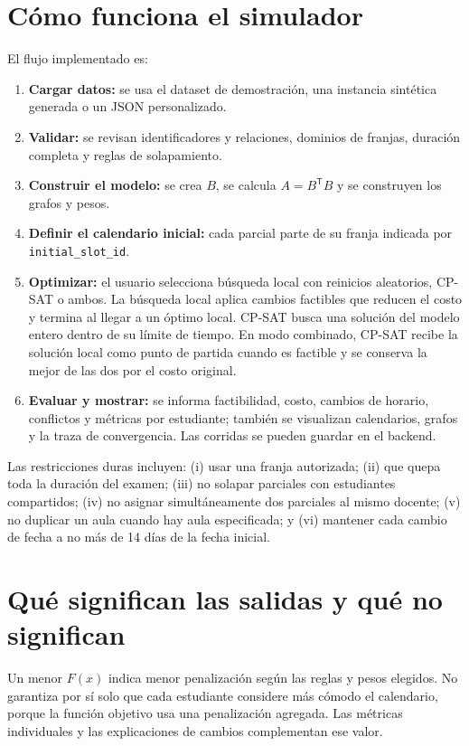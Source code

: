 \documentclass[11pt,a4paper]{article}
\begin{document}
\section{Cómo funciona el simulador}
El flujo implementado es:
\begin{enumerate}[leftmargin=*]
    \item \textbf{Cargar datos:} se usa el dataset de demostración, una instancia sintética generada o un JSON personalizado.
    \item \textbf{Validar:} se revisan identificadores y relaciones, dominios de franjas, duración completa y reglas de solapamiento.
    \item \textbf{Construir el modelo:} se crea $B$, se calcula $A=B^{\mathsf T}B$ y se construyen los grafos y pesos.
    \item \textbf{Definir el calendario inicial:} cada parcial parte de su franja indicada por \texttt{initial\_slot\_id}.
    \item \textbf{Optimizar:} el usuario selecciona búsqueda local con reinicios aleatorios, CP-SAT o ambos. La búsqueda local aplica cambios factibles que reducen el costo y termina al llegar a un óptimo local. CP-SAT busca una solución del modelo entero dentro de su límite de tiempo. En modo combinado, CP-SAT recibe la solución local como punto de partida cuando es factible y se conserva la mejor de las dos por el costo original.
    \item \textbf{Evaluar y mostrar:} se informa factibilidad, costo, cambios de horario, conflictos y métricas por estudiante; también se visualizan calendarios, grafos y la traza de convergencia. Las corridas se pueden guardar en el backend.
\end{enumerate}

Las restricciones duras incluyen: (i) usar una franja autorizada; (ii) que quepa toda la duración del examen; (iii) no solapar parciales con estudiantes compartidos; (iv) no asignar simultáneamente dos parciales al mismo docente; (v) no duplicar un aula cuando hay aula especificada; y (vi) mantener cada cambio de fecha a no más de 14 días de la fecha inicial.

\section{Qué significan las salidas y qué no significan}
Un menor $F(x)$ indica menor penalización según las reglas y pesos elegidos. No garantiza por sí solo que cada estudiante considere más cómodo el calendario, porque la función objetivo usa una penalización agregada. Las métricas individuales y las explicaciones de cambios complementan ese valor.
\end{document}
